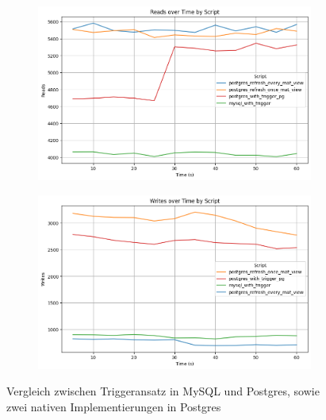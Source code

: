 \vspace{-12pt}
\begin{figure}[H]
    \centering
    \begin{subfigure}[t]{0.48\textwidth}
        \includegraphics[width=\textwidth]{PNGs/Script/Views/mat-view-comparison//Reads}
    \end{subfigure}
    \hfill
    \begin{subfigure}[t]{0.48\textwidth}
        \includegraphics[width=\textwidth]{PNGs/Script/Views/mat-view-comparison/Writes}
    \end{subfigure}
    \vspace{-7pt}
    \caption[Views: Beide Triggeransätze sowie materialisierte Sicht]{Vergleich zwischen Triggeransatz in MySQL und Postgres, sowie zwei nativen Implementierungen in Postgres }
    \label{fig:mat-view-comparison-comp-metric}
\end{figure}
\vspace{-15pt}


